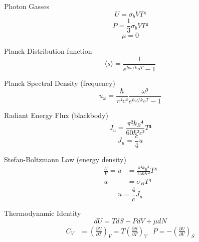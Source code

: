 \documentclass[avery5371]{flashcards}
\begin{document}
\begin{flashcard}{Photon Gasses}
	\[ U = σ_b VT⁴ \]
	\[ P = \frac 13 σ_b VT⁴ \]
	\[ μ = 0 \]
\end{flashcard}

\begin{flashcard}{Planck Distribution function}
	\[ ⟨s⟩ = \frac{1}{e^{ℏω/k_B T} - 1} \]
\end{flashcard}

\begin{flashcard}{Planck Spectral Density (frequency)}
	\[ u_ω = \frac{ℏ}{π²c³} \frac{ω³}{e^{ℏω/k_B T} - 1} \]
\end{flashcard}

\begin{flashcard}{Radiant Energy Flux (blackbody)}
	\[ J_u = \frac{π²{k_B}⁴}{60ℏ³c²} T⁴ \]
	\[ J_u = \frac{c}{4} u \]
\end{flashcard}

\begin{flashcard}{Stefan-Boltzmann Law (energy density)}
	\begin{align*}
		\frac{U}{V} = u &= \frac{π²{k_B}³}{15ℏ³c³} T⁴ \\
			u &= σ_B T⁴
	\end{align*}
	\[ u = \frac{4}{c} J_u \]
\end{flashcard}

\begin{flashcard}{Thermodynamic Identity}
	\[ dU = T dS - P dV + μ dN \]
	\begin{align*}
		C_V &= (\frac{∂U}{∂T})_V = T (\frac{∂S}{∂T})_V
			& P = -(\frac{∂U}{∂V})_S
	\end{align*}
\end{flashcard}
\end{document}
